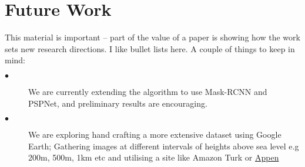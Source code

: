 \documentclass[10pt,twocolumn]{article}
\begin{document}
\section{Future Work}

This material is important -- part of the value of a paper is showing how the work sets new research directions. I like bullet lists here. A couple of things to keep in mind:
\begin{description}
 	\item[$\bullet$]  We are currently extending the algorithm to use Mask-RCNN and PSPNet, and preliminary results are encouraging.
	\item[$\bullet$] We are exploring hand crafting a more extensive dataset using Google Earth; Gathering images at different intervals of heights above sea level e.g 200m, 500m, 1km etc and utilising a site like Amazon Turk or \href{https://appen.com/}{Appen}
\end{description}




\end{document}
